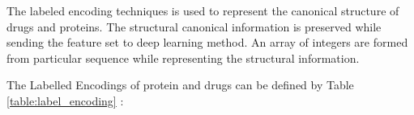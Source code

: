   The labeled encoding techniques is used to represent the canonical structure of drugs and proteins. The structural canonical information is preserved while sending the feature set to deep learning method. An array of integers are formed from particular sequence while representing the structural information.
  
  The Labelled Encodings of protein and drugs can be defined by Table \ref{table:label_encoding} :
  \begin{table}[H]
    \centering
    \caption{Labeled Encoding of Proteins and Drugs}
    \label{table:label_encoding}
    \qquad

    \qquad
  \end{table}
  

  